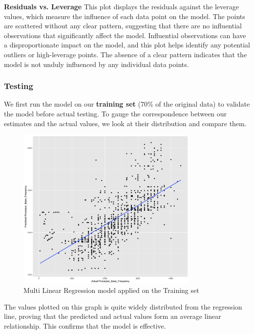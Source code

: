\textbf{Residuals vs. Leverage} This plot displays the residuals against the leverage values, which measure the influence of each data point on the model. The points are scattered without any clear pattern, suggesting that there are no influential observations that significantly affect the model. Influential observations can have a disproportionate impact on the model, and this plot helps identify any potential outliers or high-leverage points. The absence of a clear pattern indicates that the model is not unduly influenced by any individual data points. \\

\subsubsection{Testing}
We first run the model on our \textbf{training set} (70\% of the original data) to validate the model before actual testing. To gauge the correspondence between our estimates and the actual values, we look at their distribution and compare them.\\

\begin{figure}[H]
    \centering
    \includegraphics[width=0.8\textwidth]{graphics/train_set_new.png}
    \caption{Multi Linear Regression model applied on the Training set}
\end{figure}

The values plotted on this graph is quite widely distributed from the regression line, proving that the predicted and actual values form an average linear relationship. This confirms that the model is effective.\\


